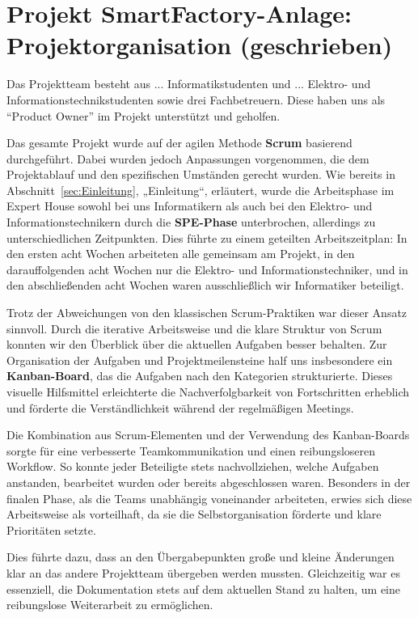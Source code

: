 \section{Projekt SmartFactory-Anlage: Projektorganisation (geschrieben)}\label{sec:Projekt SmartFactory-Anlage: Projektorganisation (am ändern)}

Das Projektteam besteht aus ... Informatikstudenten und ... Elektro- und Informationstechnikstudenten sowie drei 
Fachbetreuern. Diese haben uns als ``Product Owner'' im Projekt unterstützt und geholfen.  

Das gesamte Projekt wurde auf der agilen Methode \textbf{Scrum} basierend durchgeführt. Dabei wurden jedoch Anpassungen vorgenommen, die dem 
Projektablauf und den spezifischen Umständen gerecht wurden. Wie bereits in Abschnitt~\ref{sec:Einleitung}, „Einleitung“, erläutert, wurde die 
Arbeitsphase im Expert House sowohl bei uns Informatikern als auch bei den Elektro- und Informationstechnikern durch die \textbf{SPE-Phase} 
unterbrochen, allerdings zu unterschiedlichen Zeitpunkten. Dies führte zu einem geteilten Arbeitszeitplan: In den ersten acht Wochen arbeiteten 
alle gemeinsam am Projekt, in den darauffolgenden acht Wochen nur die Elektro- und Informationstechniker, und in den abschließenden acht Wochen 
waren ausschließlich wir Informatiker beteiligt.

Trotz der Abweichungen von den klassischen Scrum-Praktiken war dieser Ansatz sinnvoll. Durch die iterative Arbeitsweise und die klare Struktur 
von Scrum konnten wir den Überblick über die aktuellen Aufgaben besser behalten. Zur Organisation der Aufgaben und Projektmeilensteine half uns 
insbesondere ein \textbf{Kanban-Board}, das die Aufgaben nach den Kategorien strukturierte. Dieses visuelle 
Hilfsmittel erleichterte die Nachverfolgbarkeit von Fortschritten erheblich und förderte die Verständlichkeit während der regelmäßigen Meetings.

Die Kombination aus Scrum-Elementen und der Verwendung des Kanban-Boards sorgte für eine verbesserte Teamkommunikation und einen reibungsloseren 
Workflow. So konnte jeder Beteiligte stets nachvollziehen, welche Aufgaben anstanden, bearbeitet wurden oder bereits abgeschlossen waren. 
Besonders in der finalen Phase, als die Teams unabhängig voneinander arbeiteten, erwies sich diese Arbeitsweise als vorteilhaft, da sie die 
Selbstorganisation förderte und klare Prioritäten setzte.

Dies führte dazu, dass an den Übergabepunkten große und kleine Änderungen klar an das andere Projektteam übergeben werden mussten.
Gleichzeitig war es essenziell, die Dokumentation stets auf dem aktuellen Stand zu halten, um eine reibungslose Weiterarbeit 
zu ermöglichen.  

